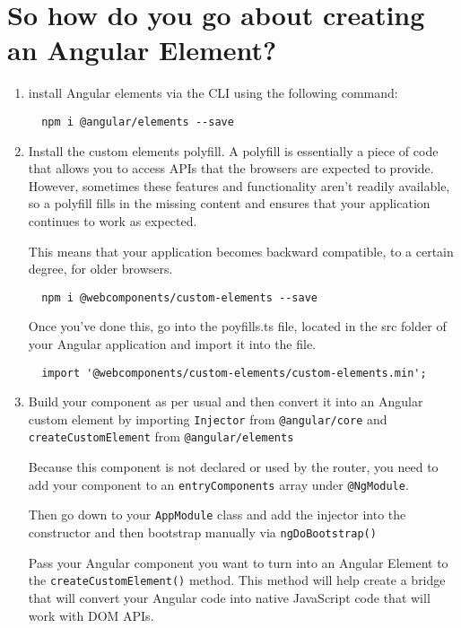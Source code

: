 \section{So how do you go about creating an Angular Element?}

\begin{enumerate}
  \item install Angular elements via the CLI using the following command: 
  \begin{verbatim}
  npm i @angular/elements --save
  \end{verbatim}

  \item Install the custom elements polyfill. A polyfill is essentially a piece of code that allows you to access APIs that the browsers are expected to provide. However, sometimes these features and functionality aren’t readily available, so a polyfill fills in the missing content and ensures that your application continues to work as expected.

  This means that your application becomes backward compatible, to a certain degree, for older browsers. 

  \begin{verbatim}
  npm i @webcomponents/custom-elements --save
  \end{verbatim}

  Once you’ve done this, go into the poyfills.ts file, located in the src folder of your Angular application and import it into the file.

  \begin{verbatim}
  import '@webcomponents/custom-elements/custom-elements.min';
  \end{verbatim}

  \item Build your component as per usual and then convert it into an Angular custom element by importing \lstinline{Injector} from \lstinline{@angular/core} and \lstinline{createCustomElement} from \lstinline{@angular/elements}
  
  Because this component is not declared or used by the router, you need to add your component to an \lstinline{entryComponents} array under \lstinline{@NgModule}. 

  Then go down to your \lstinline{AppModule} class and add the injector into the constructor and then bootstrap manually via \lstinline{ngDoBootstrap()}

  Pass your Angular component you want to turn into an Angular Element to the \lstinline{createCustomElement()} method. This method will help create a bridge that will convert your Angular code into native JavaScript code that will work with DOM APIs. 


\end{enumerate}
